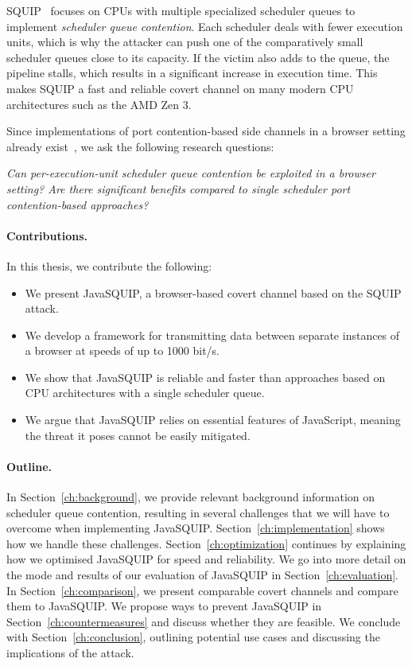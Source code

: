 \documentclass[11pt,
  titlepage=false,
  parskip=half,      %
]{scrreprt}
\begin{document}
SQUIP~\cite{squip} focuses on CPUs with multiple specialized scheduler queues to implement \textit{scheduler queue contention}.
Each scheduler deals with fewer execution units, which is why the attacker can push one of the comparatively small scheduler queues close to its capacity.
If the victim also adds to the queue, the pipeline stalls, which results in a significant increase in execution time.
This makes SQUIP a fast and reliable covert channel on many modern CPU architectures such as the AMD Zen 3.~\cite{squip}

Since implementations of port contention-based side channels in a browser setting already exist~\cite{Rokicki2022webport}, we ask the following research questions:

\textit{
    Can per-execution-unit scheduler queue contention be exploited in a browser setting?
    Are there significant benefits compared to single scheduler port contention-based approaches?
}

\pagebreak
\paragraph{Contributions.}
In this thesis, we contribute the following:
\begin{itemize}
    \item We present JavaSQUIP, a browser-based covert channel based on the SQUIP~\cite{squip} attack.
    \item We develop a framework for transmitting data between separate instances of a browser at speeds of up to 1000 bit/s.
    \item We show that JavaSQUIP is reliable and faster than approaches based on CPU architectures with a single scheduler queue.
    \item We argue that JavaSQUIP relies on essential features of JavaScript, meaning the threat it poses cannot be easily mitigated.
\end{itemize}

\paragraph{Outline.}
In Section~\ref{ch:background}, we provide relevant background information on scheduler queue contention,
resulting in several challenges that we will have to overcome when implementing JavaSQUIP.
Section~\ref{ch:implementation} shows how we handle these challenges.
Section~\ref{ch:optimization} continues by explaining how we optimised JavaSQUIP for speed and reliability.
We go into more detail on the mode and results of our evaluation of JavaSQUIP in Section~\ref{ch:evaluation}.
In Section~\ref{ch:comparison}, we present comparable covert channels and compare them to JavaSQUIP.
We propose ways to prevent JavaSQUIP in Section~\ref{ch:countermeasures} and discuss whether they are feasible.
We conclude with Section~\ref{ch:conclusion}, outlining potential use cases and discussing the implications of the attack.
\end{document}
